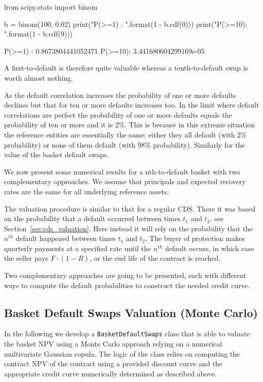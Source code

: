\begin{ipython}
from scipy.stats import binom

b = binom(100, 0.02)
print("P(>=1) : {}".format(1 - b.cdf(0)))
print("P(>=10): {}".format(1 - b.cdf(9)))
\end{ipython}
\begin{ioutput}
P(>=1) : 0.8673804441052471
P(>=10): 3.441680604299169e-05
\end{ioutput}

A first-to-default is therefore quite valuable whereas a tenth-to-default swap is worth almost nothing.

As the default correlation increases the probability of one or more defaults declines but that for ten or more defaults increases too. In the limit where default correlations are perfect the probability of one or more defaults equals the probability of ten or more and it is 2\%. This is because in this extreme situation the reference entities are essentially the same: either they all default (with 2\% probability) or none of them default (with 98\% probability). Similarly for the value of the basket default swaps.

We now present some numerical results for a nth-to-default basket with two complementary approaches. We assume that principals and expected recovery rates are the same for all underlying reference assets. 

The valuation procedure is similar to that for a regular CDS. There it was based on the probability that a default occurred between times $t_1$ and $t_2$, see Section~\ref{sec:cds_valuation}. Here instead it will rely on the probability that the $n^{th}$ default happened between times $t_1$ and $t_2$. The buyer of protection makes quarterly payments at a specified rate until the $n^{th}$ default occurs, in which case the seller pays $F\cdot(1-R)$, or the end life of the contract is reached. 

Two complementary approaches are going to be presented, each with different ways to compute the default probabilities to construct the needed credit curve.

\subsection{Basket Default Swaps Valuation (Monte Carlo)}
\label{basket-cds-valuation-with-monte-carlo}

\begin{finmarkets}
In the following we develop a \texttt{BasketDefaultSwaps} class that is able to valuate the basket NPV using a Monte Carlo approach relying on a numerical multivariate Gaussian copula. 
The logic of the class relies on computing the contract NPV of the contract using a provided discount curve and the appropriate credit curve numerically determined as described above.
\end{finmarkets}

